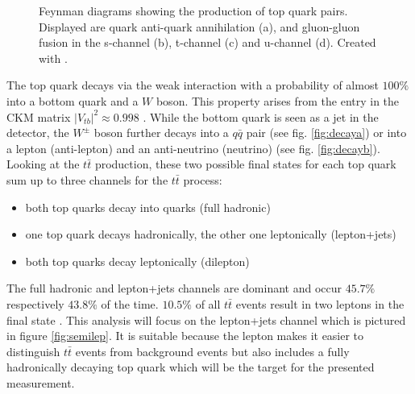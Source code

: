 \begin{figure}
\begin{subfigure}{.4\textwidth}
		\caption{}
		\label{fig:productionc}
		\end{subfigure}
		\begin{subfigure}{.4\textwidth}
		\caption{}
		\label{fig:productiond}
		\end{subfigure}
		\caption{Feynman diagrams showing the production of top quark pairs. Displayed are quark anti-quark annihilation (a), and gluon-gluon fusion in the s-channel (b), t-channel  (c) and u-channel (d). Created with \cite{feynman}.}
		\label{fig:production}
	\end{figure}	
	The top quark decays via the weak interaction with a probability of almost $100\%$ into a bottom quark and a $W$ boson. This property arises from the entry in the CKM matrix $|V_{tb}|^2 \approx 0.998$ \cite{pdg2016}. While the bottom quark is seen as a jet in the detector, the $W^\pm$ boson further decays into a $q\bar{q}$ pair (see fig. \ref{fig:decaya}) or into a lepton (anti-lepton) and an anti-neutrino (neutrino) (see fig. \ref{fig:decayb}). Looking at the $t\bar{t}$ production, these two possible final states for each top quark sum up to three channels for the $t\bar{t}$ process: 
	\begin{itemize}
	\item both top quarks decay into quarks (full hadronic)
	\item one top quark decays hadronically, the other one leptonically (lepton+jets)
	\item both top quarks decay leptonically (dilepton)
	\end{itemize}
	The full hadronic and lepton+jets channels are dominant and occur $45.7\%$ respectively $43.8\%$ of the time. $10.5\%$ of all $t\bar{t}$ events result in two leptons in the final state \cite{pdg2016}. This analysis will focus on the lepton+jets channel which is pictured in figure \ref{fig:semilep}. It is suitable because the lepton makes it easier to distinguish $t\bar{t}$ events from background events but also includes a fully hadronically decaying top quark which will be the target for the presented measurement.
	
